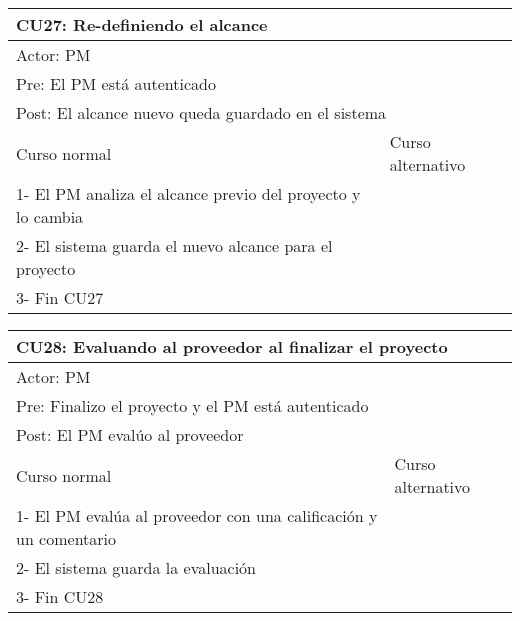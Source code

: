 \begin{table}[H]
  \begin{adjustbox}{max width = \textwidth}
  \begin{tabular}{|l|l|}
    \hline
    \multicolumn{2}{|l|}{CU27: Re-definiendo el alcance} \\\hline
    \multicolumn{2}{|l|}{Actor: PM} \\\hline
    \multicolumn{2}{|l|}{Pre:  El PM está autenticado} \\\hline
    \multicolumn{2}{|l|}{Post: El alcance nuevo queda guardado en el sistema} \\\hline
     Curso normal & Curso alternativo\\ \hline
     1- El PM analiza el alcance previo del proyecto y lo cambia & \\ \hline
  	 2- El sistema guarda el nuevo alcance para el proyecto & \\ \hline
     3- Fin CU27 & \\ \hline
 \end{tabular}
  \end{adjustbox}
\end{table}

\begin{table}[H]
  \begin{adjustbox}{max width = \textwidth}
  \begin{tabular}{|l|l|}
    \hline
    \multicolumn{2}{|l|}{CU28: Evaluando al proveedor al finalizar el proyecto} \\\hline
    \multicolumn{2}{|l|}{Actor: PM} \\\hline
    \multicolumn{2}{|l|}{Pre: Finalizo el proyecto y el PM está autenticado} \\\hline
    \multicolumn{2}{|l|}{Post: El PM evalúo al proveedor} \\\hline
     Curso normal & Curso alternativo\\ \hline
	 1- El PM evalúa al proveedor con una calificación y un comentario & \\ \hline
	 2- El sistema guarda la evaluación & \\ \hline
   3- Fin CU28 & \\ \hline
  \end{tabular}
  \end{adjustbox}
\end{table}

